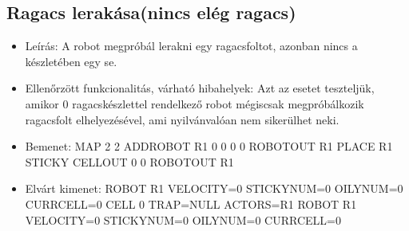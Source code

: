\subsection{Ragacs lerakása(nincs elég ragacs)}
\begin{itemize}
	\item Leírás: \newline
	 A robot megpróbál lerakni egy ragacsfoltot, azonban nincs a készletében egy se.
	\item Ellenőrzött funkcionalitás, várható hibahelyek: \newline 
	Azt az esetet teszteljük, amikor 0 ragacskészlettel rendelkező robot mégiscsak megpróbálkozik ragacsfolt elhelyezésével, ami nyilvánvalóan nem sikerülhet neki.
	
	\item Bemenet: \newline
	MAP 2 2 \newline
	ADDROBOT R1 0 0 0 0 \newline
	ROBOTOUT R1 \newline
	PLACE R1 STICKY \newline
	CELLOUT 0 0 \newline
 	ROBOTOUT R1 \newline
	
	\item Elvárt kimenet: \newline
	ROBOT R1 VELOCITY=0 STICKYNUM=0 OILYNUM=0 CURRCELL=0 \newline
	CELL 0 TRAP=NULL ACTORS=R1 \newline
	ROBOT R1 VELOCITY=0 STICKYNUM=0 OILYNUM=0 CURRCELL=0 \newline
\end{itemize}

